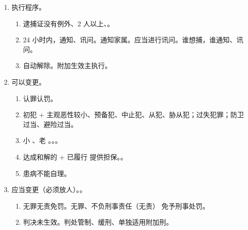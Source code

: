 \begin{enumerate}
\begin{enumerate}
\begin{enumerate}
                  \item 侦查活动重大违法。
                  \item 重大、复杂疑难。
                \end{enumerate}
          \item {}。
                \begin{enumerate}
                  \item 说明理由。
                  \item 需补充侦查则通知公安。。
                \end{enumerate}
          \item 原条件不变的情况下不批捕救济 \yjt 复议复核。。
        \end{enumerate}
  \item 执行程序。
        \begin{enumerate}
          \item 逮捕证没有例外、2 人以上、。
          \item 24 小时内，通知、讯问。\yi 通知家属。\er 应当进行讯问。谁想捕，谁通知、讯问。
          \item 自动解除。附加生效主执行。
        \end{enumerate}
  \item 可以变更。
        \begin{enumerate}
          \item 认罪认罚。
          \item 初犯 + 主观恶性较小、预备犯、中止犯、从犯、胁从犯；过失犯罪；防卫过当、避险过当。
          \item 小 、老 。。。
          \item 达成和解的 + 已履行 \hz 提供担保。。
          \item 患病不能自理。
        \end{enumerate}
  \item 应当变更（必须放人）。。
        \begin{enumerate}
          \item 无罪无责免罚。无罪、不负刑事责任（无责） \hz 免予刑事处罚。
          \item 判决未生效。判处管制、缓刑、单独适用附加刑。

\end{enumerate}
\end{enumerate}

